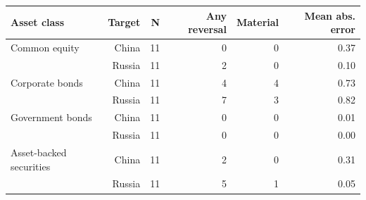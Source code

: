 \begin{tabular}{lrrrrr}
\toprule
Asset class & Target & N & Any reversal & Material & Mean abs. error \\
\midrule
Common equity & China & 11 & 0 & 0 & 0.37 \\
 & Russia & 11 & 2 & 0 & 0.10 \\
Corporate bonds & China & 11 & 4 & 4 & 0.73 \\
 & Russia & 11 & 7 & 3 & 0.82 \\
Government bonds & China & 11 & 0 & 0 & 0.01 \\
 & Russia & 11 & 0 & 0 & 0.00 \\
Asset-backed securities & China & 11 & 2 & 0 & 0.31 \\
 & Russia & 11 & 5 & 1 & 0.05 \\
\bottomrule
\end{tabular}

